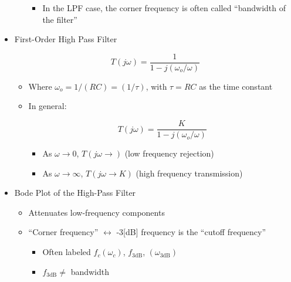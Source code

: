 \begin{itemize}
\begin{itemize}
\begin{itemize}
          \item In the LPF case, the corner frequency is often called ``bandwidth of the filter''

        \end{itemize}

    \end{itemize}

  \item First-Order High Pass Filter

    $$T(j\omega)=\frac{1}{1-j(\omega_o/\omega)}$$

    \begin{itemize}

      \item Where $\omega_o=1/(RC)=(1/\tau)$, with $\tau=RC$ as the time constant

      \item In general:

        $$T(j\omega)=\frac{K}{1-j(\omega_o/\omega)}$$

        \begin{itemize}

          \item As $\omega\to 0$, $T(j\omega\to)$ (low frequency rejection)

          \item As $\omega\to \infty$, $T(j\omega\to K)$ (high frequency transmission)

        \end{itemize}

    \end{itemize}

  \item Bode Plot of the High-Pass Filter

    \begin{itemize}

      \item Attenuates low-frequency components

      \item ``Corner frequency'' $\leftrightarrow$ -3[dB] frequency is the ``cutoff frequency''

        \begin{itemize}

          \item Often labeled $f_c(\omega_c)$, $f_{3\text{dB}}$, $(\omega_{3\text{dB}})$

          \item $f_{3\text{dB}}\neq$ bandwidth


\end{itemize}
\end{itemize}
\end{itemize}
